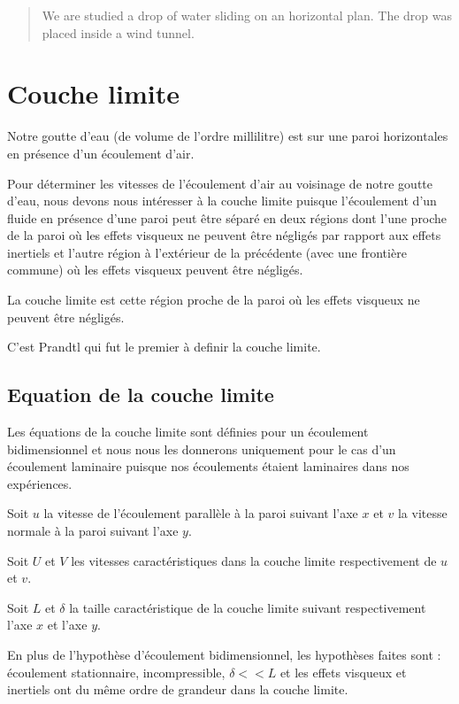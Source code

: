 \documentclass[french]{article}
\begin{document}
 
\tableofcontents
 
\vspace{2cm} %
 
\begin{abstract}
We are studied a drop of water sliding on an horizontal plan. The drop was placed inside a wind tunnel.
\end{abstract}

\section{Couche limite}
Notre goutte d'eau (de volume de l'ordre millilitre) est sur une paroi horizontales en présence d'un écoulement d'air.


Pour déterminer les vitesses de l'écoulement d'air au voisinage de notre goutte d'eau, nous devons nous intéresser à la couche limite puisque l'écoulement d'un fluide en présence d'une paroi peut être séparé en deux régions dont l'une proche de la paroi où les effets visqueux ne peuvent être négligés par rapport aux effets inertiels et l'autre région à l'extérieur de la précédente (avec une frontière commune) où les effets visqueux peuvent être négligés.

La couche limite est cette région proche de la paroi où les effets visqueux ne peuvent être négligés.

C'est Prandtl qui fut le premier à definir la couche limite. 

\subsection{Equation de la couche limite }

Les équations de la couche limite sont définies pour un écoulement bidimensionnel et nous nous les donnerons uniquement pour le cas d'un écoulement laminaire puisque nos écoulements étaient laminaires dans nos expériences.

Soit $u$ la vitesse de l'écoulement parallèle à la paroi suivant l'axe $x$ et $v$ la vitesse normale à la paroi suivant l'axe $y$.

Soit $U$ et $V$ les vitesses caractéristiques dans la couche limite respectivement de $u$ et $v$.

Soit $L$ et $\delta$ la taille caractéristique de la couche limite suivant respectivement l'axe $x$ et l'axe $y$.

En plus de l'hypothèse d'écoulement bidimensionnel, les hypothèses faites sont : écoulement stationnaire, incompressible, $\delta << L$ et les effets visqueux et inertiels ont du même ordre de grandeur dans la couche limite.
\end{document}
